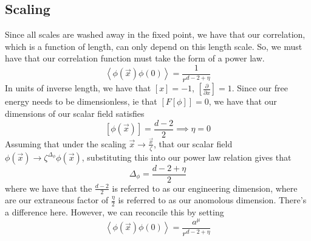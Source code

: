 \subsection{Scaling}
Since all scales are washed away in the fixed point, 
we have that our correlation, which is a function of length, 
can only depend on this length scale. So, we must have that 
our correlation function must take the form of a power law. 
\[
	\left< \phi ( \vec{x} ) \phi ( 0 )  \right> = \frac{1}{ r ^{ d - 2 + \eta }}
\] In units of inverse length, we have that 
$ [ x ]  = - 1$,  $ \left[ \frac{\partial }{\partial x }   \right]  = 1 $. 
Since our free energy needs to be dimensionless, 
ie that $ [ F [ \phi ] ]  = 0 $, we have that our dimensions 
of our scalar field satisfies \[
	[ \phi ( \vec{x} ) ] = \frac{d -2  }{ 2 } \implies \eta = 0 
\] Assuming that under the scaling $ \vec{x} \to \frac{\vec{x} }{ \zeta}$, 
that our scalar field $ \phi ( \vec{x} ) \to \zeta ^{ \Delta_{ \phi } } \phi ( \vec{x} ) $, 
substituting this into our power law relation gives that 
\[
 \Delta_\phi = \frac{d -2 + \eta }{ 2 } 
\]  where we have that the $ \frac{d - 2 }{ 2 } $ is referred to 
as our engineering dimension, where are our extraneous factor 
of $ \frac{\eta }{ 2 } $ is referred to as our anomolous dimension. 
There's a difference here. However, we can reconcile this by 
setting 
\[
	\left< \phi ( \vec{x} ) \phi  (0 )  \right>  = \frac{a ^ \mu }{ r ^{ d - 2 + \eta }}
\] 
